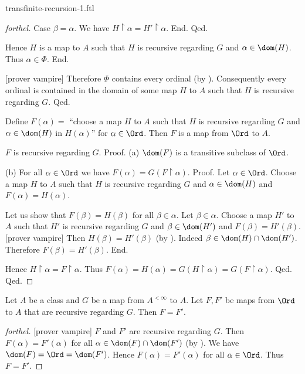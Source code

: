 \documentclass{naproche-library}
\begin{document}
\begin{smodule}{transfinite-recursion-1.ftl}
\begin{proof}[forthel]
          Case $\beta = \alpha$.
            We have $H \restriction \alpha = H' \restriction \alpha$.
          End.
        Qed.

        Hence $H$ is a map to $A$ such that $H$ is recursive regarding $G$ and $\alpha \in \dom(H)$.
        Thus $\alpha \in \Phi$.
      End.

      [prover vampire]
      Therefore $\Phi$ contains every ordinal (by ).
      Consequently every ordinal is contained in the domain of some map $H$ to $A$ such that $H$ is recursive regarding $G$.
    Qed.

    Define $F(\alpha) =$ ``choose a map $H$ to $A$ such that $H$ is recursive regarding $G$ and $\alpha \in \dom(H)$ in $H(\alpha)$'' for $\alpha \in \Ord$.
    Then $F$ is a map from $\Ord$ to $A$.

    $F$ is recursive regarding $G$. \newline
    Proof.
      (a) $\dom(F)$ is a transitive subclass of $\Ord$.

      (b) For all $\alpha \in \Ord$ we have $F(\alpha) = G(F \restriction \alpha)$. \newline
      Proof.
        Let $\alpha \in \Ord$.
        Choose a map $H$ to $A$ such that $H$ is recursive regarding $G$ and $\alpha \in \dom(H)$ and $F(\alpha) = H(\alpha)$.

        Let us show that $F(\beta) = H(\beta)$ for all $\beta \in \alpha$.
          Let $\beta \in \alpha$.
          Choose a map $H'$ to $A$ such that $H'$ is recursive regarding $G$ and $\beta \in \dom(H')$ and $F(\beta) = H'(\beta)$.
          [prover vampire]
          Then $H(\beta) = H'(\beta)$ (by ).
          Indeed $\beta \in \dom(H) \cap \dom(H')$.
          Therefore $F(\beta) = H'(\beta)$.
        End.

        Hence $H \restriction \alpha = F \restriction \alpha$.
        Thus $F(\alpha)
          = H(\alpha)
          = G(H \restriction \alpha)
          = G(F \restriction \alpha)$.
      Qed.
    Qed.
  \end{proof}
  
  \begin{theorem*}[forthel,title=Transfinite Recursion Theorem: Uniqueness,id=transfinite-recursion_uniqueness]
    Let $A$ be a class and $G$ be a map from $A^{< \infty}$ to $A$.
    Let $F, F'$ be maps from $\Ord$ to $A$ that are recursive regarding $G$.
    Then $F = F'$.
  \end{theorem*}
  \begin{proof}[forthel]
    [prover vampire]
    $F$ and $F'$ are recursive regarding $G$.
    Then $F(\alpha) = F'(\alpha)$ for all $\alpha \in \dom(F) \cap \dom(F')$ (by ).
    We have $\dom(F) = \Ord = \dom(F')$.
    Hence $F(\alpha) = F'(\alpha)$ for all $\alpha \in \Ord$.
    Thus $F = F'$.
  \end{proof}
\end{smodule}
\end{document}
